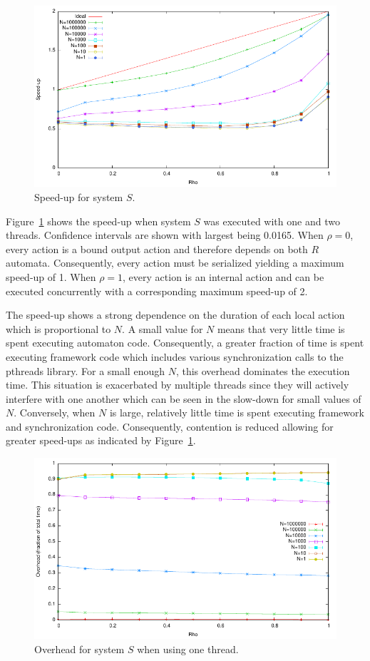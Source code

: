 \begin{figure}
\center
\includegraphics[width=\columnwidth]{speed_up}
\caption{Speed-up for system $S$.\label{speed_up}}
\end{figure}

Figure~\ref{speed_up} shows the speed-up when system $S$ was executed with one and two threads.
Confidence intervals are shown with largest being 0.0165.
When $\rho = 0$, every action is a bound output action and therefore depends on both $R$ automata.
Consequently, every action must be serialized yielding a maximum speed-up of 1.
When $\rho = 1$, every action is an internal action and can be executed concurrently with a corresponding maximum speed-up of 2.

The speed-up shows a strong dependence on the duration of each local action which is proportional to $N$.
A small value for $N$ means that very little time is spent executing automaton code.
Consequently, a greater fraction of time is spent executing framework code which includes various synchronization calls to the pthreads library.
For a small enough $N$, this overhead dominates the execution time.
This situation is exacerbated by multiple threads since they will actively interfere with one another which can be seen in the slow-down for small values of $N$.
Conversely, when $N$ is large, relatively little time is spent executing framework and synchronization code.
Consequently, contention is reduced allowing for greater speed-ups as indicated by Figure~\ref{speed_up}.

\begin{figure}
\center
\includegraphics[width=\columnwidth]{overhead1}
\caption{Overhead for system $S$ when using one thread.\label{overhead1}}
\end{figure}

